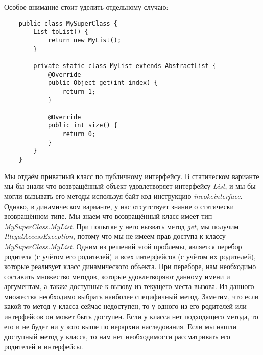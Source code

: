 Особое внимание стоит уделить отдельному случаю:

\begin{verbatim}
    public class MySuperClass {
        List toList() {
            return new MyList();
        }
    
        private static class MyList extends AbstractList {
            @Override
            public Object get(int index) {
                return 1;
            }
    
            @Override
            public int size() {
                return 0;
            }
        }
    }
\end{verbatim}

Мы отдаём приватный класс по публичному интерфейсу. В статическом варианте мы бы знали что возвращённый объект удовлетворяет интерфейсу \textit{List}, и мы бы могли вызывать его методы используя байт-код инструкцию \textit{invokeinterface}. Однако, в динамическом варианте, у нас отсутствует знание о статически возвращённом типе. Мы знаем что возвращённый класс имеет тип \textit{MySuperClass.MyList}. При попытке у него вызвать метод \textit{get}, мы получим \textit{IllegalAccessException}, потому что мы не имеем прав доступа к классу \textit{MySuperClass.MyList}. Одним из решений этой проблемы, является перебор родителя (с учётом его родителей) и всех интерфейсов (с учётом их родителей), которые реализует класс динамического объекта. При переборе, нам необходимо составить множество методов, которые удовлетворяют данному имени и аргументам, а также доступные к вызову из текущего места вызова. Из данного множества необходимо выбрать наиболее специфичный метод. Заметим, что если какой-то метод у класса сейчас недоступен, то у одного из его родителей или интерфейсов он может быть доступен. Если у класса нет подходящего метода, то его и не будет ни у кого выше по иерархии наследования. Если мы нашли доступный метод у класса, то нам нет необходимости рассматривать его родителей и интерфейсы.


